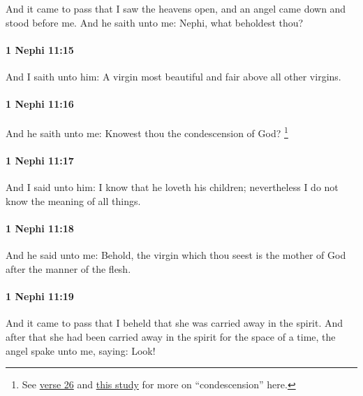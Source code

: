 			And it came to pass that I saw the heavens open,
			and an angel came down and stood before me.
			And he saith unto me:
			Nephi, what beholdest thou?

		\paragraph{1 Nephi 11:15} %
			\label{1NEPHI-11-15}

			And I saith unto him:
			A virgin most beautiful and fair above all other virgins.

		\paragraph{1 Nephi 11:16} %
			\label{1NEPHI-11-16}

			And he saith unto me:
			Knowest thou the condescension of God?%
				\footnote{%
					\label{1NEPHI-11-16-NOTE-condescension}%
					See \hyperref[1NEPHI-11-26]{verse 26} and \hyperref[CONDESCENSION-1nephi]{this study} for more on ``condescension'' here.
					}

		\paragraph{1 Nephi 11:17} %
			\label{1NEPHI-11-17}

			And I said unto him:
			I know that he loveth his children;
			nevertheless I do not know the meaning of all things.

		\paragraph{1 Nephi 11:18} %
			\label{1NEPHI-11-18}

			And he said unto me:
			Behold, the virgin which thou seest is the mother of God
			after the manner of the flesh.

		\paragraph{1 Nephi 11:19} %
			\label{1NEPHI-11-19}

			And it came to pass that I beheld that she was carried away in the spirit.
			And after that she had been carried away in the spirit for the space of a time,
			the angel spake unto me, saying: Look!

